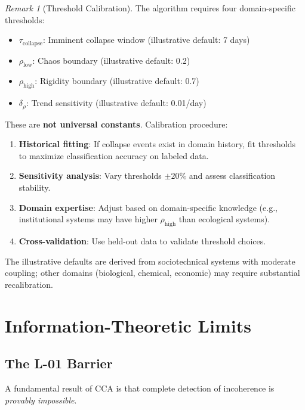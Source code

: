 \documentclass[11pt,a4paper]{article}
\theoremstyle{definition}
\theoremstyle{remark}
\newtheorem{remark}{Remark}[section]
\begin{document}
\begin{remark}[Threshold Calibration]
The algorithm requires four domain-specific thresholds:
\begin{itemize}[noitemsep]
    \item $\tau_{\text{collapse}}$: Imminent collapse window (illustrative default: 7 days)
    \item $\rho_{\text{low}}$: Chaos boundary (illustrative default: 0.2)
    \item $\rho_{\text{high}}$: Rigidity boundary (illustrative default: 0.7)
    \item $\delta_\rho$: Trend sensitivity (illustrative default: 0.01/day)
\end{itemize}

These are \textbf{not universal constants}. Calibration procedure:
\begin{enumerate}[noitemsep]
    \item \textbf{Historical fitting}: If collapse events exist in domain history, fit thresholds to maximize classification accuracy on labeled data.
    \item \textbf{Sensitivity analysis}: Vary thresholds $\pm 20\%$ and assess classification stability.
    \item \textbf{Domain expertise}: Adjust based on domain-specific knowledge (e.g., institutional systems may have higher $\rho_{\text{high}}$ than ecological systems).
    \item \textbf{Cross-validation}: Use held-out data to validate threshold choices.
\end{enumerate}
The illustrative defaults are derived from sociotechnical systems with moderate coupling; other domains (biological, chemical, economic) may require substantial recalibration.
\end{remark}

\section{Information-Theoretic Limits}

\subsection{The L-01 Barrier}

A fundamental result of CCA is that complete detection of incoherence is \textit{provably impossible}.
\end{document}

